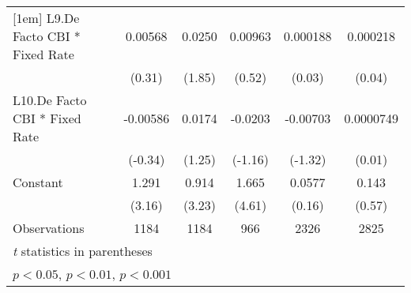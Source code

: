 {\begin{longtable}{l*{5}{c}}
[1em]
L9.De Facto CBI * Fixed Rate&  0.00568         &   0.0250         &  0.00963         & 0.000188         & 0.000218         \\
                &   (0.31)         &   (1.85)         &   (0.52)         &   (0.03)         &   (0.04)         \\
[1em]
L10.De Facto CBI * Fixed Rate& -0.00586         &   0.0174         &  -0.0203         & -0.00703         &0.0000749         \\
                &  (-0.34)         &   (1.25)         &  (-1.16)         &  (-1.32)         &   (0.01)         \\
[1em]
Constant        &    1.291\sym{**} &    0.914\sym{**} &    1.665\sym{***}&   0.0577         &    0.143         \\
                &   (3.16)         &   (3.23)         &   (4.61)         &   (0.16)         &   (0.57)         \\
\hline
Observations    &     1184         &     1184         &      966         &     2326         &     2825         \\
\hline\hline
\multicolumn{6}{l}{\footnotesize \textit{t} statistics in parentheses}\\
\multicolumn{6}{l}{\footnotesize \sym{*} \(p<0.05\), \sym{**} \(p<0.01\), \sym{***} \(p<0.001\)}\\
\end{longtable}
}
